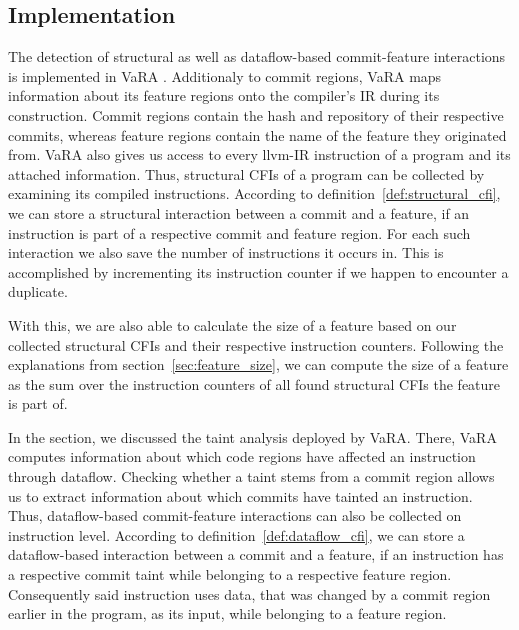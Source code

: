 \subsection{Implementation}\label{ch:implementation}

The detection of structural as well as dataflow-based commit-feature interactions is implemented in VaRA \cite{VaRA2023}.
Additionaly to commit regions, VaRA maps information about its feature regions onto the compiler's IR during its construction.
Commit regions contain the hash and repository of their respective commits, whereas feature regions contain the name of the feature they originated from.
VaRA also gives us access to every llvm-IR instruction of a program and its attached information.
Thus, structural CFIs of a program can be collected by examining its compiled instructions.
According to definition~\ref{def:structural_cfi}, we can store a structural interaction between a commit and a feature, if an instruction is part of a respective commit and feature region.
For each such interaction we also save the number of instructions it occurs in. 
This is accomplished by incrementing its instruction counter if we happen to encounter a duplicate. 

With this, we are also able to calculate the size of a feature based on our collected structural CFIs and their respective instruction counters.
Following the explanations from section~\ref{sec:feature_size}, we can compute the size of a feature as the sum over the instruction counters of all found structural CFIs the feature is part of. 

In the  section, we discussed the taint analysis deployed by VaRA.
There, VaRA computes information about which code regions have affected an instruction through dataflow.
Checking whether a taint stems from a commit region allows us to extract information about which commits have tainted an instruction.
Thus, dataflow-based commit-feature interactions can also be collected on instruction level.
According to definition~\ref{def:dataflow_cfi}, we can store a dataflow-based interaction between a commit and a feature, if an instruction has a respective commit taint while belonging to a respective feature region.
Consequently said instruction uses data, that was changed by a commit region earlier in the program, as its input, while belonging to a feature region. 
\iffalse
For our research we examine numerous software projects to get a wide range of reference data, as commit-feature interactions could potentially vary greatly between different code spaces.
Accordingly, the VaRA-Tool-Suite was extended making it possible to generate a report comprising all found CFIs of an according type in a software project.
This aids us in examining several software projects to gain sufficient and sensible data about commit-feature interactions.
The created reports are also evaluated in the VaRA-Tool-Suite, which offers support to process and display statstics of the generated data. \\
\fi 
